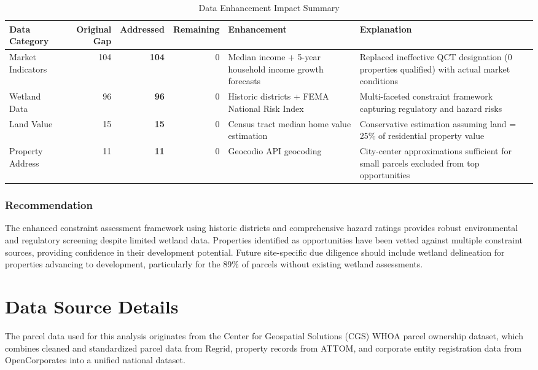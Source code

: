 \documentclass[
  letterpaper,
  DIV=11,
  numbers=noendperiod,
  oneside]{scrreprt}
\begin{document}
\begin{longtable}[t]{lr>{}r>{}rll}
\caption{\label{tab:unnamed-chunk-3}Data Enhancement Impact Summary}\\
\toprule
Data Category & Original Gap & Addressed & Remaining & Enhancement & Explanation\\
\midrule
Market Indicators & 104 & \textcolor[HTML]{8baeaa}{\textbf{104}} & \textcolor[HTML]{666666}{0} & Median income + 5-year household income growth forecasts & Replaced ineffective QCT designation (0 properties qualified) with actual market conditions\\
Wetland Data & 96 & \textcolor[HTML]{8baeaa}{\textbf{96}} & \textcolor[HTML]{666666}{0} & Historic districts + FEMA National Risk Index & Multi-faceted constraint framework capturing regulatory and hazard risks\\
Land Value & 15 & \textcolor[HTML]{8baeaa}{\textbf{15}} & \textcolor[HTML]{666666}{0} & Census tract median home value estimation & Conservative estimation assuming land = 25\% of residential property value\\
Property Address & 11 & \textcolor[HTML]{8baeaa}{\textbf{11}} & \textcolor[HTML]{666666}{0} & Geocodio API geocoding & City-center approximations sufficient for small parcels excluded from top opportunities\\
\bottomrule
\end{longtable}

\subsection{Recommendation}\label{recommendation}

The enhanced constraint assessment framework using historic districts
and comprehensive hazard ratings provides robust environmental and
regulatory screening despite limited wetland data. Properties identified
as opportunities have been vetted against multiple constraint sources,
providing confidence in their development potential. Future
site-specific due diligence should include wetland delineation for
properties advancing to development, particularly for the 89\% of
parcels without existing wetland assessments.

\chapter{Data Source Details}\label{data-source-details}

The parcel data used for this analysis originates from the Center for
Geospatial Solutions (CGS) WHOA parcel ownership dataset, which combines
cleaned and standardized parcel data from Regrid, property records from
ATTOM, and corporate entity registration data from OpenCorporates into a
unified national dataset.
\end{document}
